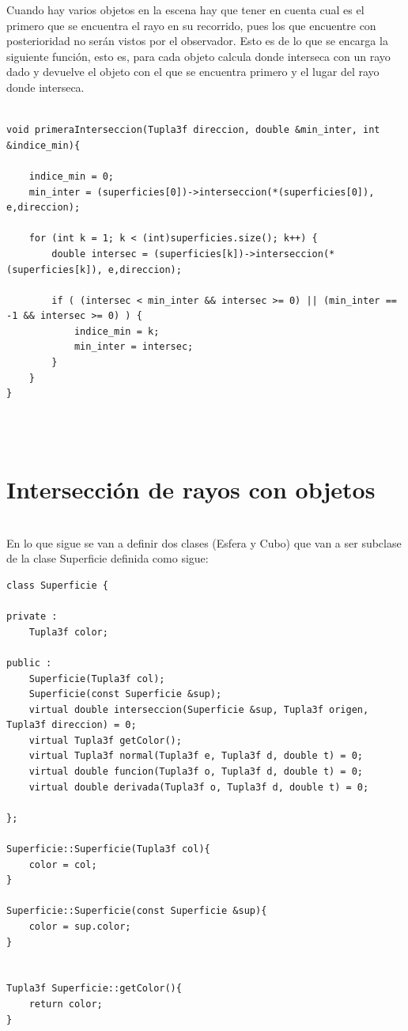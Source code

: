 Cuando hay varios objetos en la escena hay que tener en cuenta cual es el primero que se encuentra el rayo en su recorrido, pues los que encuentre con posterioridad no serán vistos por el observador. Esto es de lo que se encarga la siguiente función, esto es, para cada objeto calcula donde interseca con un rayo dado y devuelve el objeto con el que se encuentra primero y el lugar del rayo donde interseca.
${ }$\\

\begin{lstlisting}[style=Consola]

void primeraInterseccion(Tupla3f direccion, double &min_inter, int &indice_min){

	indice_min = 0;
	min_inter = (superficies[0])->interseccion(*(superficies[0]), e,direccion);

	for (int k = 1; k < (int)superficies.size(); k++) {
		double intersec = (superficies[k])->interseccion(*(superficies[k]), e,direccion);

		if ( (intersec < min_inter && intersec >= 0) || (min_inter == -1 && intersec >= 0) ) {
			indice_min = k;
			min_inter = intersec;
		}
	}
}
\end{lstlisting}
${ }$\\

${ }$\\
\section{Intersección de rayos con objetos}
${ }$\\

En lo que sigue se van a definir dos clases (Esfera y Cubo) que van a ser subclase de la clase Superficie definida como sigue:

\begin{lstlisting}[style=Consola]
class Superficie {

private :
	Tupla3f color;

public :
	Superficie(Tupla3f col);
	Superficie(const Superficie &sup);
	virtual double interseccion(Superficie &sup, Tupla3f origen, Tupla3f direccion) = 0;
	virtual Tupla3f getColor();
	virtual Tupla3f normal(Tupla3f e, Tupla3f d, double t) = 0;
	virtual double funcion(Tupla3f o, Tupla3f d, double t) = 0;
	virtual double derivada(Tupla3f o, Tupla3f d, double t) = 0;

};

Superficie::Superficie(Tupla3f col){
	color = col;
}

Superficie::Superficie(const Superficie &sup){
	color = sup.color;
}


Tupla3f Superficie::getColor(){
	return color;
}

\end{lstlisting}
${ }$\\

